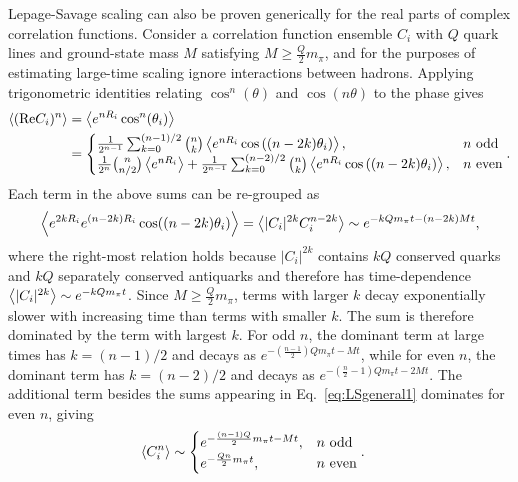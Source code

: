 Lepage-Savage scaling can also be proven generically for the real parts of complex correlation functions.
Consider a correlation function ensemble $C_i$ with $Q$ quark lines and ground-state mass $M$ satisfying $M \geq \frac{Q}{2}m_\pi$, and for the purposes of estimating large-time scaling ignore interactions between hadrons.
Applying trigonometric identities relating $\cos^n(\theta)$ and $\cos(n\theta)$ to the phase gives
\begin{equation}
  \begin{split}
    \left< (\text{Re} C_i)^n \right> &= \left< e^{nR_i}\cos^n(\theta_i) \right> \\
        &= \begin{cases} \frac{1}{2^{n-1}}\sum_{k=0}^{(n-1)/2} {n \choose k} \left< e^{n R_i}\cos\left( (n-2k)\theta_i \right) \right> , 
        & n\text{ odd} \\ 
        \frac{1}{2^n}{n\choose n/2} \left< e^{n R_i} \right> + \frac{1}{2^{n-1}}\sum_{k=0}^{(n-2)/2} {n \choose k} \left< e^{n R_i}\cos\left( (n-2k)\theta_i \right) \right> , 
        & n\text{ even} \end{cases}.
    \end{split}\label{eq:LSgeneral1}
\end{equation}
Each term in the above sums can be re-grouped as 
\begin{equation}
  \begin{split}
    \left< e^{2k R_i}e^{(n-2k)R_i}\cos( (n-2k) \theta_i) \right> = \left< |C_i|^{2k}C_i^{n-2k} \right> \sim e^{-k Q m_\pi t - (n-2k) M t},
  \end{split}
\end{equation}
where the right-most relation holds because $|C_i|^{2k}$ contains $kQ$ conserved quarks and $kQ$ separately conserved antiquarks and therefore has time-dependence $\left< |C_i|^{2k} \right> \sim e^{-k Q m_\pi t}$.
Since $M \geq \frac{Q}{2}m_\pi$, terms with larger $k$ decay exponentially slower with increasing time than terms with smaller $k$.
The sum is therefore dominated by the term with largest $k$.
For odd $n$, the dominant term at large times has $k= (n-1)/2$ and decays as $e^{-(\frac{n-1}{2}) Q m_\pi t - M t}$,
while for even $n$, the dominant term has $k = (n-2)/2$ and decays as $e^{-(\frac{n}{2} - 1) Q m_\pi t - 2 M t}$.
The additional term besides the sums appearing in Eq.~\eqref{eq:LSgeneral1} dominates for even $n$, giving
\begin{equation}
  \begin{split}
    \left< C_i^n \right>  &\sim \begin{cases} e^{-\frac{(n-1)Q}{2}m_\pi t - M t} , & n\text{ odd} \\
      e^{-\frac{Q n}{2} m_\pi t} , & n\text{ even} \end{cases}.
  \end{split}\label{eq:LSgeneral}
\end{equation}
